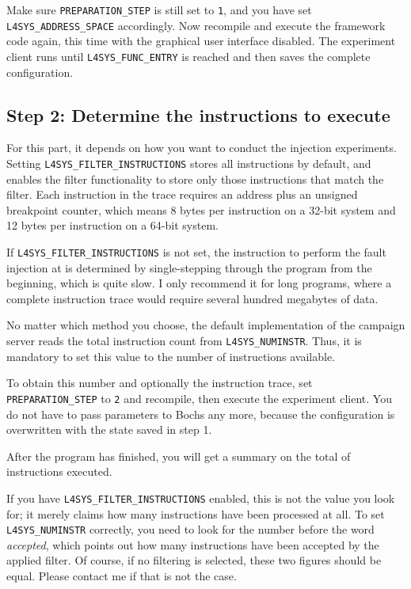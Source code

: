 \documentclass[a4paper,10pt]{article}
\begin{document}
Make sure \verb+PREPARATION_STEP+ is still set to \texttt{1}, and
you have set \verb+L4SYS_ADDRESS_SPACE+ accordingly.
Now recompile and execute the framework code again, this time with the graphical
user interface disabled. The experiment client runs until
\verb+L4SYS_FUNC_ENTRY+ is reached and then saves
the complete configuration.

\subsection{Step 2: Determine the instructions to execute}

For this part, it depends on how you want to conduct the injection
experiments. Setting \verb+L4SYS_FILTER_INSTRUCTIONS+
stores all instructions by default, and
enables the filter functionality to store only those
instructions that match the filter.
Each instruction in the trace requires
an address plus an unsigned breakpoint counter,
which means 8 bytes per instruction on a 32-bit system
and 12 bytes per instruction on a 64-bit system.

If \verb+L4SYS_FILTER_INSTRUCTIONS+ is not set, the instruction
to perform the fault injection at is determined by single-stepping
through the program from the beginning, which is quite slow.
I only recommend it for long programs, where a complete
instruction trace would require several hundred megabytes of data.

No matter which method you choose, the default implementation
of the campaign server reads the total instruction count
from \verb+L4SYS_NUMINSTR+. Thus, it is mandatory to set this
value to the number of instructions available.

To obtain this number and optionally the instruction trace,
set \verb+PREPARATION_STEP+ to \texttt{2} and recompile, then execute
the experiment client. You do not have to pass parameters to Bochs
any more, because the configuration is overwritten with the
state saved in step 1.

After the program has finished, you will get a summary on the
total of instructions executed.

If you have
\verb+L4SYS_FILTER_INSTRUCTIONS+ enabled, this is not the
value you look for; it merely claims how many
instructions have been processed at all.
To set \verb+L4SYS_NUMINSTR+ correctly, you need to look for the
number before the word \emph{accepted}, which points out how many
instructions have been accepted by the applied filter. Of course,
if no filtering is selected, these two figures should be equal.
Please contact me if that is not the case.
\end{document}
